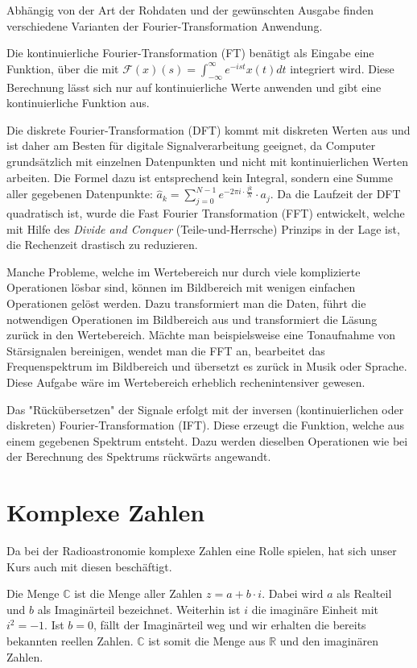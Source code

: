\documentclass[]{dsadokumentation}
\begin{document}
Abhängig von der Art der Rohdaten und der gewünschten Ausgabe finden verschiedene Varianten der Fourier-Transformation Anwendung.

Die kontinuierliche Fourier-Transformation (FT) benätigt als Eingabe eine Funktion, über die mit $\mathcal{F}(x)(s)=\int_{-\infty}^{\infty}e^{-ist}x(t)dt$ integriert wird. Diese Berechnung lässt sich nur auf kontinuierliche Werte anwenden und gibt eine kontinuierliche Funktion aus.

Die diskrete Fourier-Transformation (DFT) kommt mit diskreten Werten aus und ist daher am Besten für digitale Signalverarbeitung geeignet, da Computer grundsätzlich mit einzelnen Datenpunkten und nicht mit kontinuierlichen Werten arbeiten. Die Formel dazu ist entsprechend kein Integral, sondern eine Summe aller gegebenen Datenpunkte: $\hat a_k = \sum\limits_{j=0}^{N-1}e^{-2\pi i\cdot\frac{jk}{N}}\cdot a_j$. Da die Laufzeit der DFT quadratisch ist, wurde die Fast Fourier Transformation (FFT) entwickelt, welche mit Hilfe des \emph{Divide and Conquer} (Teile-und-Herrsche) Prinzips in der Lage ist, die Rechenzeit drastisch zu reduzieren.

Manche Probleme, welche im Wertebereich nur durch viele komplizierte Operationen l\"osbar sind, k\"onnen im Bildbereich mit wenigen einfachen Operationen gel\"ost werden. Dazu transformiert man die Daten, führt die notwendigen Operationen im Bildbereich aus und transformiert die Läsung zurück in den Wertebereich. Mächte man beispielsweise eine Tonaufnahme von Stärsignalen bereinigen, wendet man die FFT an, bearbeitet das Frequenspektrum im Bildbereich und übersetzt es zurück in Musik oder Sprache. Diese Aufgabe w\"are im Wertebereich erheblich rechenintensiver gewesen.

Das "Rückübersetzen" der Signale erfolgt mit der inversen (kontinuierlichen oder diskreten) Fourier-Transformation (IFT). Diese erzeugt die Funktion, welche aus einem gegebenen Spektrum entsteht. Dazu werden dieselben Operationen wie bei der Berechnung des Spektrums rückwärts angewandt.

\section{Komplexe Zahlen}

Da bei der Radioastronomie komplexe Zahlen eine Rolle spielen, hat sich unser Kurs auch mit diesen beschäftigt.

Die Menge $\mathbb{C}$ ist die Menge aller Zahlen $z=a+b\cdot i$. Dabei wird $a$ als Realteil und $b$ als Imaginärteil bezeichnet. Weiterhin ist $i$ die imagin\"are Einheit mit $i^{2} = -1$. Ist $b = 0$, fällt der Imaginärteil weg und wir erhalten die bereits bekannten reellen Zahlen. $\mathbb{C}$ ist somit die Menge aus $\mathbb{R}$ und den imaginären Zahlen.
\end{document}
